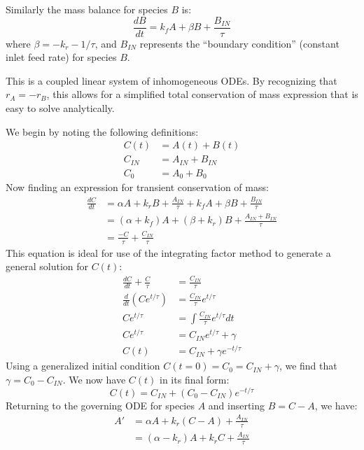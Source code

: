 \documentclass[a4paper,12pt]{article}
\begin{document}
Similarly the mass balance for species $B$ is:
\begin{equation}
    \frac{dB}{dt} = k_f A + \beta B + \frac{B_{IN}}{\tau}
\end{equation}
where $\beta = -k_r - 1/\tau$, and $B_{IN}$ represents the ``boundary condition'' (constant inlet feed rate) for species $B$. 

This is a coupled linear system of inhomogeneous ODEs.
By recognizing that $r_A = -r_B$, this allows for a simplified total conservation of mass expression that is easy to solve analytically.

We begin by noting the following definitions:
\begin{align}
    C(t) &= A(t) + B(t)\\
    C_{IN} &= A_{IN} + B_{IN}\\
    C_0 &= A_0 + B_0
\end{align}
Now finding an expression for transient conservation of mass:
\begin{align}
    \frac{dC}{dt} &= \alpha A + k_r B + \frac{A_{IN}}{\tau} + k_f A + \beta B + \frac{B_{IN}}{\tau}\\
    &= (\alpha + k_f)A + (\beta + k_r)B + \frac{A_{IN} + B_{IN}}{\tau}\\
    &= \frac{-C}{\tau} + \frac{C_{IN}}{\tau}
\end{align}
This equation is ideal for use of the integrating factor method to generate a general solution for $C(t)$:
\begin{align}
    \frac{dC}{dt} + \frac{C}{\tau} &= \frac{C_{IN}}{\tau}\\
    \frac{d}{dt}(Ce^{t/\tau}) &=\frac{C_{IN}}{\tau} e^{t/\tau}\\
    Ce^{t/\tau} &= \int \frac{C_{IN}}{\tau} e^{t/\tau} dt\\
    Ce^{t/\tau} &= C_{IN}e^{t/\tau} + \gamma\\
    C(t) &= C_{IN} + \gamma  e^{-t/\tau}
\end{align}
Using a generalized initial condition $C(t=0) = C_0 = C_{IN} + \gamma$, we find that $\gamma = C_0 - C_{IN}$.
We now have $C(t)$ in its final form:
\begin{equation}
    C(t) = C_{IN} + (C_0 - C_{IN}) e^{-t/\tau}
\end{equation}
Returning to the governing ODE for species $A$ and inserting $B = C-A$, we have:
\begin{align}
    A' &= \alpha A + k_r (C-A) + \frac{A_{IN}}{\tau}\\
    &= (\alpha- k_r)A + k_r C + \frac{A_{IN}}{\tau}
\end{align}
\end{document}
